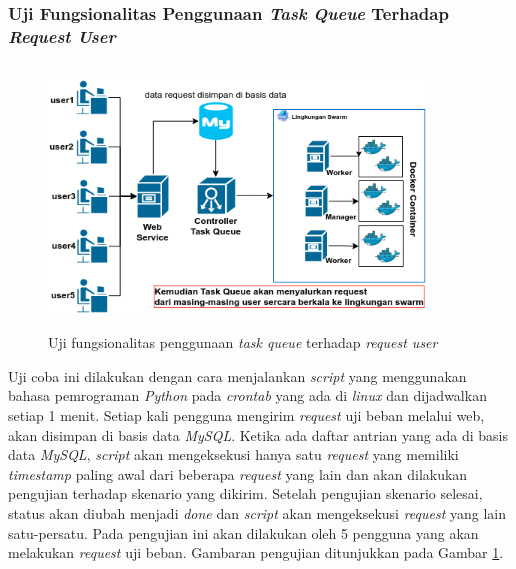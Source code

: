 		\subsubsection{Uji Fungsionalitas Penggunaan \textit{Task Queue} Terhadap \textit{Request User}}
			\begin{figure}[H]
				\centering
				\includegraphics[width=10cm,height=7cm]{Images/C-5/taskqueue.png}
				\caption{Uji fungsionalitas penggunaan \textit{task queue} terhadap \textit{request user}}
				\label{gambartaskqueue}
			\end{figure}
			Uji coba ini dilakukan dengan cara menjalankan \textit{script} yang menggunakan bahasa pemrograman \textit{Python} pada \textit{crontab} yang ada di \textit{linux} dan dijadwalkan setiap 1 menit. Setiap kali pengguna mengirim \textit{request} uji beban melalui web, akan disimpan di basis data \textit{MySQL}. Ketika ada daftar antrian yang ada di basis data \textit{MySQL}, \textit{script} akan mengeksekusi hanya satu \textit{request} yang memiliki \textit{timestamp} paling awal dari beberapa \textit{request} yang lain dan akan dilakukan pengujian terhadap skenario yang dikirim. Setelah pengujian skenario selesai, status akan diubah menjadi \textit{done} dan \textit{script} akan mengeksekusi \textit{request} yang lain satu-persatu. Pada pengujian ini akan dilakukan oleh 5 pengguna yang akan melakukan \textit{request} uji beban. Gambaran pengujian ditunjukkan pada Gambar \ref{gambartaskqueue}.
			
		
